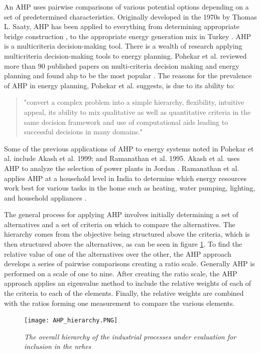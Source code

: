 An AHP uses pairwise comparisons of various potential options depending on a set of predetermined characteristics. Originally developed in the 1970s by Thomas L. Saaty, AHP has been applied to everything from determining appropriate bridge construction \cite{Pan2008}, to the appropriate energy generation mix in Turkey \cite{Kahraman2010, Saaty1987}. AHP is a multicriteria decision-making tool. There is a wealth of research applying multicriteria decision-making tools to energy planning. Pohekar et al. reviewed more than 90 published papers on multi-criteria decision making and energy planning and found \ac{ahp} to be the most popular \cite{Pohekar2004}. The reasons for the prevalence of AHP in energy planning, Pohekar et al. suggests, is due to its ability to:
\begin{quote}
	"convert a complex problem into a simple hierarchy, flexibility, intuitive appeal, its ability to mix qualitative as well as quantitative criteria in the same decision framework and use of computational aids leading to successful decisions in many domains.\cite{Pohekar2004}"
 \end{quote}
Some of the previous applications of AHP to energy systems noted in Pohekar et al. include Akash et al.  1999; and Ramanathan et al. 1995. Akash et al. uses AHP to analyze the selection of power plants in Jordan \cite{Akash1999}.  Ramanathan et al. applies AHP at a household level in India to determine which energy resources work best for various tasks in the home such as heating, water pumping, lighting, and household appliances \cite{Ramanathan1995}.

The general process for applying AHP involves initially determining a set of alternatives and a set of criteria on which to compare the alternatives. The hierarchy comes from the objective being structured above the criteria, which is then structured above the alternatives, as can be seen in figure \ref{AHP_struct}. To find the relative value of one of the alternatives over the other, the AHP approach develops a series of pairwise comparisons creating a ratio scale.  Generally AHP is performed on a scale of one to nine. After creating the ratio scale, the AHP approach applies an eigenvalue method to include the relative weights of each of the criteria to each of  the elements. Finally, the relative weights are combined with the ratios forming one measurement to compare the various elements.

\begin{figure}[h!]
  \centering
  \texttt{[image: AHP\_hierarchy.PNG]}
  \caption{\small \sl The overall hierarchy of the industrial processes under evaluation for inclusion in the \ac{nrhes}}
  \label{AHP_struct}
\end{figure}

